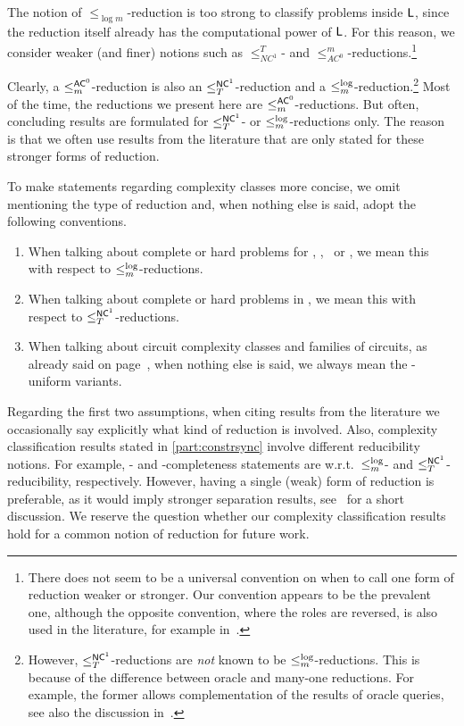 
The notion of $\leq_{\log m}$-reduction is too strong to classify problems inside $\textsf{L}$, since the reduction itself already has the computational power of $\textsf{L}$. For this reason, we consider weaker (and finer) notions such as $\leq^{T}_{NC^1}$- and $\leq^{m}_{AC^0}$-reductions.\footnote{There does not seem to be a universal convention on when to call one form of reduction weaker or stronger. Our convention appears to be the prevalent one, although the opposite convention, where the roles are reversed, is also used in the literature, for example in~\cite{DBLP:journals/siamcomp/ChandraSV84}.}	

Clearly, a $\le_m^{\textup{\textsf{AC}}^0}$-reduction is also an $\le_T^{\textup{\textsf{NC}}^{1}}$-reduction and a $\le_m^{\log}$-reduction.\footnote{However, $\le_T^{\textup{\textsf{NC}}^{1}}$-reductions
	are \emph{not} known to be $\le_m^{\log}$-reductions.
	This is because of the difference between oracle and many-one
	reductions. For example, the former allows complementation
	of the results of oracle queries, see also the discussion in~\cite[Sect.~23.6]{DBLP:books/crc/99/AllenderLR2010a}.}
Most of the time, the reductions we present here
are $\le_m^{\textup{\textsf{AC}}^0}$-reductions. But often, 
concluding results are formulated for $\le_T^{\textup{\textsf{NC}}^{1}}$-
or $\le_m^{\log}$-reductions only.
The reason  is that we often use results from the literature that are only
stated for these stronger forms of reduction.

To make statements regarding complexity classes 
more concise, we omit mentioning the type of reduction  and, 
when nothing else is said, adopt the following conventions.

\begin{enumerate}
	\item When talking about complete or hard problems
	for \NL, \PTIME, \NP\  or \PSPACE, we
	mean this with respect to $\le_m^{\log}$-reductions.
	
	\item When talking about complete or hard problems 
	in \LOGSPACE, we mean this with respect to $\le_T^{\textup{\textsf{NC}}^{1}}$-reductions.	
	
	\item When talking about circuit complexity classes and families of circuits, as 
	already said on page~\pageref{prelim:rem:circuit-uniform},
	when nothing else is said, 
	we always mean the \LOGSPACE-uniform variants. 
\end{enumerate}

Regarding the first two assumptions, when citing results from the literature
we occasionally say explicitly what kind of reduction is involved. 
Also, complexity classification
results stated in \cref{part:constrsync} involve
 different reducibility notions. For example, \NP-
and \LOGSPACE-completeness statements are w.r.t.~$\le_m^{\log}$- and $\le_T^{\textup{\textsf{NC}}^{1}}$-reducibility, respectively.
However, having a single (weak) form of reduction is preferable,
as it would imply stronger separation results, see~\cite[Sect.~23.6.1]{DBLP:books/crc/99/AllenderLR2010a} for a short discussion. 
We reserve the question
whether our complexity classification results hold for a common
notion of reduction for future work.

